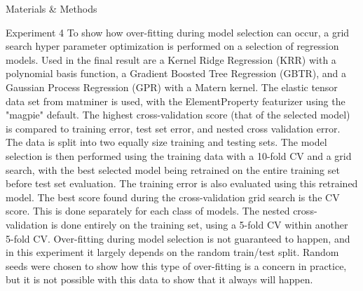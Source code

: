 \documentclass[onecolumn,abstract,paper=letter]{scrartcl}
\begin{document}
\begin{section}{Materials \& Methods}

\begin{subsection}{Experiment 4}
To show how over-fitting during model selection can occur, a grid search hyper parameter optimization is performed on a selection of regression models.
Used in the final result are a Kernel Ridge Regression (KRR) with a polynomial basis function, a Gradient Boosted Tree Regression (GBTR), and a Gaussian Process Regression (GPR) with a Matern kernel.  
The elastic tensor data set from matminer is used, with the ElementProperty featurizer using the "magpie" default.
The highest cross-validation score (that of the selected model) is compared to training error, test set error, and nested cross validation error. 
The data is split into two equally size training and testing sets. 
The model selection is then performed using the training data with a 10-fold CV and a grid search, with the best selected model being retrained on the entire training set before test set evaluation. 
The training error is also evaluated using this retrained model.
The best score found during the cross-validation grid search is the CV score.
This is done separately for each class of models.
The nested cross-validation is done entirely on the training set, using a 5-fold CV within another 5-fold CV.
Over-fitting during model selection is not guaranteed to happen, and in this experiment it largely depends on the random train/test split. 
Random seeds were chosen to show how this type of over-fitting is a concern in practice, but it is not possible with this data to show that it always will happen. 



\end{subsection}




\end{section}

\end{document}
